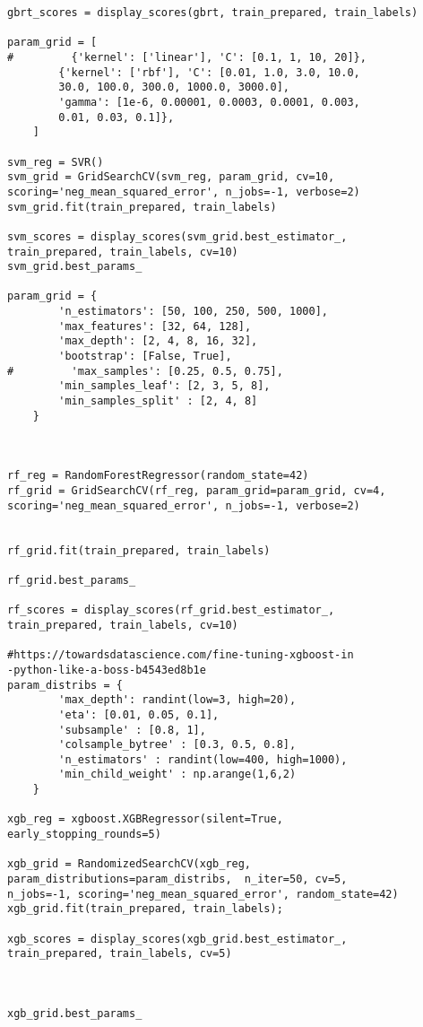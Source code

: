 \documentclass[12pt]{article}%
\begin{document}
\begin{lstlisting}
gbrt_scores = display_scores(gbrt, train_prepared, train_labels)

param_grid = [
#         {'kernel': ['linear'], 'C': [0.1, 1, 10, 20]},
        {'kernel': ['rbf'], 'C': [0.01, 1.0, 3.0, 10.0, 
        30.0, 100.0, 300.0, 1000.0, 3000.0], 
        'gamma': [1e-6, 0.00001, 0.0003, 0.0001, 0.003,
        0.01, 0.03, 0.1]},
    ]

svm_reg = SVR()
svm_grid = GridSearchCV(svm_reg, param_grid, cv=10, 
scoring='neg_mean_squared_error', n_jobs=-1, verbose=2)
svm_grid.fit(train_prepared, train_labels)

svm_scores = display_scores(svm_grid.best_estimator_, 
train_prepared, train_labels, cv=10)
svm_grid.best_params_

param_grid = {
        'n_estimators': [50, 100, 250, 500, 1000],
        'max_features': [32, 64, 128],
        'max_depth': [2, 4, 8, 16, 32],
        'bootstrap': [False, True],
#         'max_samples': [0.25, 0.5, 0.75],
        'min_samples_leaf': [2, 3, 5, 8],
        'min_samples_split' : [2, 4, 8]
    }



rf_reg = RandomForestRegressor(random_state=42)
rf_grid = GridSearchCV(rf_reg, param_grid=param_grid, cv=4,
scoring='neg_mean_squared_error', n_jobs=-1, verbose=2)


rf_grid.fit(train_prepared, train_labels)

rf_grid.best_params_

rf_scores = display_scores(rf_grid.best_estimator_,
train_prepared, train_labels, cv=10)

#https://towardsdatascience.com/fine-tuning-xgboost-in
-python-like-a-boss-b4543ed8b1e
param_distribs = {
        'max_depth': randint(low=3, high=20),
        'eta': [0.01, 0.05, 0.1],
        'subsample' : [0.8, 1],
        'colsample_bytree' : [0.3, 0.5, 0.8],
        'n_estimators' : randint(low=400, high=1000),
        'min_child_weight' : np.arange(1,6,2)
    }

xgb_reg = xgboost.XGBRegressor(silent=True,
early_stopping_rounds=5)

xgb_grid = RandomizedSearchCV(xgb_reg,
param_distributions=param_distribs,  n_iter=50, cv=5, 
n_jobs=-1, scoring='neg_mean_squared_error', random_state=42)
xgb_grid.fit(train_prepared, train_labels);

xgb_scores = display_scores(xgb_grid.best_estimator_, 
train_prepared, train_labels, cv=5)



xgb_grid.best_params_


\end{lstlisting}
\end{document}

